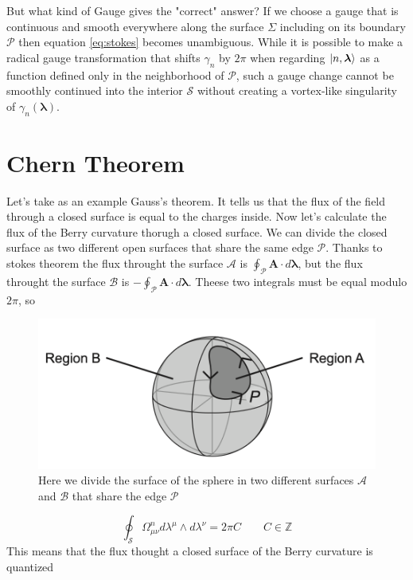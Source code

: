     But what kind of Gauge gives the "correct" answer? If we choose a gauge that is continuous and smooth
    everywhere along the surface $\Sigma$ including on its boundary $\mathcal P$ then equation \ref{eq:stokes} becomes unambiguous.\newline
    While it is possible to make a radical gauge transformation that shifts $\gamma_n$ by $2\pi$ when regarding $\ket{n,\boldsymbol \lambda}$ as a function defined only in the neighborhood of $\mathcal P$, such a gauge change cannot be smoothly continued into the interior $\mathcal S$ without creating a vortex-like singularity of $\gamma_n(\boldsymbol \lambda)$.


\section{Chern Theorem}
    
    Let's take as an example Gauss's theorem. It tells us that the flux of the field through a closed surface is equal to the charges inside. \newline
    Now let's calculate the flux of the Berry curvature thorugh a closed surface. We can divide the closed surface as two different open surfaces that share the same edge $\mathcal P$.\newline
    Thanks to stokes theorem the flux throught the surface $\mathcal A$ is $\oint_\mathcal{P} \mathbf A \cdot d\boldsymbol \lambda$, but the flux throught the surface $\mathcal B$ is $-\oint_\mathcal{P} \mathbf A \cdot d\boldsymbol \lambda$.\newline
    Theese two integrals must be equal modulo $2\pi$, so
    \begin{figure}
        \centering
        \includegraphics[width=0.85\linewidth]{../website/images/berry/chern_theorem.png}
        \caption{Here we divide the surface of the sphere in two different surfaces $\mathcal A$ and $\mathcal B$ that share the edge $\mathcal P$}
        \label{fig:forward_pass}
    \end{figure}
    \begin{equation}
        \label{eq:chern}
        \oint_\mathcal{S} \Omega_{\mu\nu}^n d\lambda^\mu \wedge d\lambda^\nu =2\pi C \quad\quad C\in \mathbb Z
    \end{equation}
    This means that the flux thought a closed surface of the Berry curvature is quantized
    
